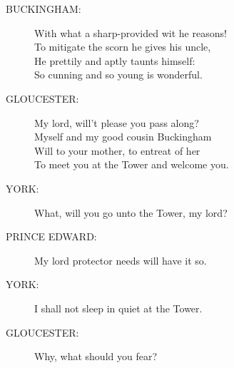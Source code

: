\documentclass{article}
\begin{document}
\begin{description}
\item[BUCKINGHAM:] 
\hspace{1pt}With what a sharp-provided wit he reasons!\\
\hspace{1pt}To mitigate the scorn he gives his uncle,\\
\hspace{1pt}He prettily and aptly taunts himself:\\
\hspace{1pt}So cunning and so young is wonderful.\\
\end{description}
\begin{description}
\item[GLOUCESTER:] 
\hspace{1pt}My lord, will't please you pass along?\\
\hspace{1pt}Myself and my good cousin Buckingham\\
\hspace{1pt}Will to your mother, to entreat of her\\
\hspace{1pt}To meet you at the Tower and welcome you.\\
\end{description}
\begin{description}
\item[YORK:] 
\hspace{1pt}What, will you go unto the Tower, my lord?\\
\end{description}
\begin{description}
\item[PRINCE EDWARD:] 
\hspace{1pt}My lord protector needs will have it so.\\
\end{description}
\begin{description}
\item[YORK:] 
\hspace{1pt}I shall not sleep in quiet at the Tower.\\
\end{description}
\begin{description}
\item[GLOUCESTER:] 
\hspace{1pt}Why, what should you fear?\\
\end{description}
\end{document}
